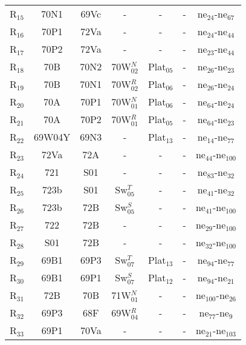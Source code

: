 \begin{table}[!h]
{{\begin{tabular}{ c c c c c c c }
                    R$_{15}$ & 70N1 & 69Vc & - & - & - & ne$_{24}$-ne$_{67}$\\
                    R$_{16}$ & 70P1 & 72Va & - & - & - & ne$_{24}$-ne$_{44}$\\
                    R$_{17}$ & 70P2 & 72Va & - & - & - & ne$_{23}$-ne$_{44}$\\
                    R$_{18}$ & 70B & 70N2 & 70W$_{02}^{N}$ & Plat$_{05}$ & - & ne$_{26}$-ne$_{23}$\\
                    R$_{19}$ & 70B & 70N1 & 70W$_{02}^{R}$ & Plat$_{06}$ & - & ne$_{26}$-ne$_{24}$\\
                    R$_{20}$ & 70A & 70P1 & 70W$_{01}^{N}$ & Plat$_{06}$ & - & ne$_{64}$-ne$_{24}$\\
                    R$_{21}$ & 70A & 70P2 & 70W$_{01}^{R}$ & Plat$_{05}$ & - & ne$_{64}$-ne$_{23}$\\
                    R$_{22}$ & 69W04Y & 69N3 & - & Plat$_{13}$ & - & ne$_{14}$-ne$_{77}$\\
                    R$_{23}$ & 72Va & 72A & - & - & - & ne$_{44}$-ne$_{100}$\\
                    R$_{24}$ & 721 & S01 & - & - & - & ne$_{83}$-ne$_{32}$\\
                    R$_{25}$ & 723b & S01 & Sw$_{05}^{T}$ & - & - & ne$_{41}$-ne$_{32}$\\
                    R$_{26}$ & 723b & 72B & Sw$_{05}^{S}$ & - & - & ne$_{41}$-ne$_{100}$\\
                    R$_{27}$ & 722 & 72B & - & - & - & ne$_{29}$-ne$_{100}$\\
                    R$_{28}$ & S01 & 72B & - & - & - & ne$_{32}$-ne$_{100}$\\
                    R$_{29}$ & 69B1 & 69P3 & Sw$_{07}^{T}$ & Plat$_{13}$ & - & ne$_{94}$-ne$_{77}$\\
                    R$_{30}$ & 69B1 & 69P1 & Sw$_{07}^{S}$ & Plat$_{12}$ & - & ne$_{94}$-ne$_{21}$\\
                    R$_{31}$ & 72B & 70B & 71W$_{01}^{N}$ & - & - & ne$_{100}$-ne$_{26}$\\
                    R$_{32}$ & 69P3 & 68F & 69W$_{04}^{R}$ & - & - & ne$_{77}$-ne$_{9}$\\
                    R$_{33}$ & 69P1 & 70Va & - & - & - & ne$_{21}$-ne$_{103}$\\
                \hline
            \end{tabular}
        }
     }
    \end{table}